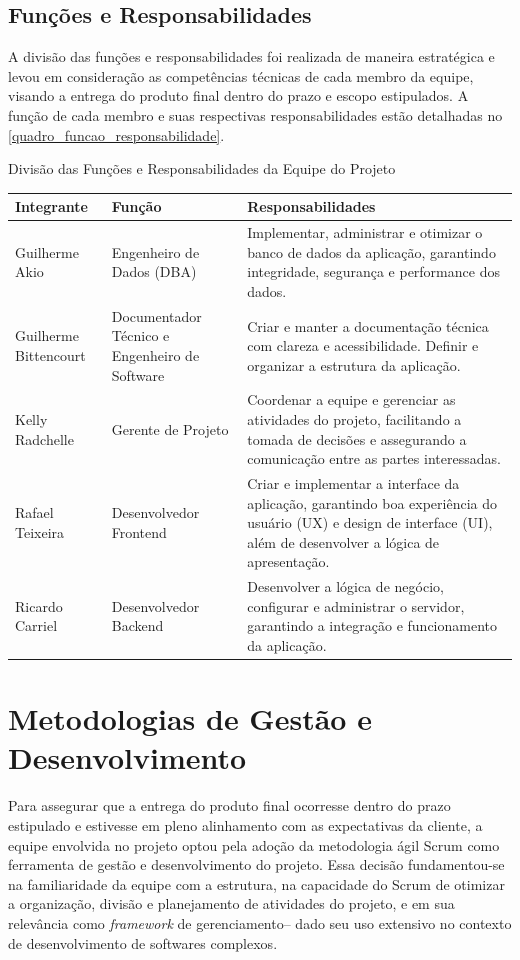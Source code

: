 \documentclass[
	12pt,				%
	openany,			%
	oneside,			%
	a4paper,			%
	english,			%
	french,				%
	spanish,			%
	brazil				%
	]{abntex2}
\renewcommand{\arraystretch}{1.4}
\begin{document}
\subsection{Funções e Responsabilidades}
A divisão das funções e responsabilidades foi realizada de maneira estratégica e levou em consideração as competências técnicas de cada membro da equipe, visando a entrega do produto final dentro do prazo e escopo estipulados. 	A função de cada membro e suas respectivas responsabilidades estão detalhadas no \autoref{quadro_funcao_responsabilidade}.
%	
\begin{quadro}[H]
	\caption{Divisão das Funções e Responsabilidades da Equipe do Projeto}
	\label{quadro_funcao_responsabilidade}
	\renewcommand{\arraystretch}{1.3} %
	\begin{tabular}{|>{\raggedright\arraybackslash}m{3cm} 
			|>{\raggedright\arraybackslash}m{4.5cm} 
			|>{\raggedright\arraybackslash}m{6.7cm}|}
		\hline
		\textbf{Integrante} & \textbf{Função} & \textbf{Responsabilidades} \\ \hline
		Guilherme Akio & Engenheiro de Dados (DBA) & Implementar, administrar e otimizar o banco de dados da aplicação, garantindo integridade, segurança e performance dos dados. \\ \hline
		Guilherme Bittencourt & Documentador Técnico e Engenheiro de Software & Criar e manter a documentação técnica com clareza e acessibilidade. Definir e organizar a estrutura da aplicação. \\ \hline
		Kelly Radchelle & Gerente de Projeto & Coordenar a equipe e gerenciar as atividades do projeto, facilitando a tomada de decisões e assegurando a comunicação entre as partes interessadas. \\ \hline
		Rafael Teixeira & Desenvolvedor Frontend & Criar e implementar a interface da aplicação, garantindo boa experiência do usuário (UX) e design de interface (UI), além de desenvolver a lógica de apresentação. \\ \hline
		Ricardo Carriel & Desenvolvedor Backend & Desenvolver a lógica de negócio, configurar e administrar o servidor, garantindo a integração e funcionamento da aplicação. \\ \hline
	\end{tabular}
\end{quadro}
%
\section{Metodologias de Gestão e Desenvolvimento}
Para assegurar que a entrega do produto final ocorresse dentro do prazo estipulado e estivesse em pleno alinhamento com as expectativas da cliente, a equipe envolvida no projeto optou pela adoção da metodologia ágil Scrum como ferramenta de gestão e desenvolvimento do projeto. Essa decisão fundamentou-se na familiaridade da equipe com a estrutura, na capacidade do Scrum de otimizar a organização, divisão e planejamento de atividades do projeto, e em sua relevância como \textit{framework} de gerenciamento– dado seu uso extensivo no contexto de desenvolvimento de softwares complexos.
\end{document}
